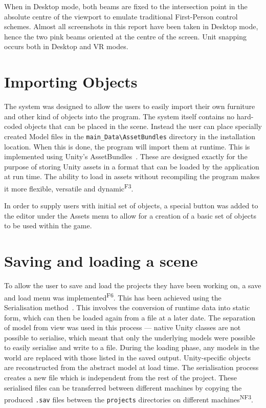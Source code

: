 When in Desktop mode, both beams are fixed to the intersection point in the absolute centre of the viewport to emulate traditional First-Person control schemes. Almost all screenshots in this report have been taken in Desktop mode, hence the two pink beams oriented at the centre of the screen. Unit snapping occurs both in Desktop and VR modes.

\section{Importing Objects}
\label{sec:objects}
\label{sec:import}
The system was designed to allow the users to easily import their own furniture and other kind of objects into the program. The system itself contains no hard-coded objects that can be placed in the scene. Instead the user can place specially created Model files in the \verb|main_Data\AssetBundles| directory in the installation location. When this is done, the program will import them  at runtime. This is implemented using Unity's AssetBundles~\cite{unity:assetbundle}. These are designed exactly for the purpose of storing Unity assets in a format that can be loaded by the application at run time. The ability to load in assets without recompiling the program makes it more flexible, versatile and dynamic\textsuperscript{F3}.

In order to supply users with initial set of objects, a special button was added to the editor under the Assets menu to allow for a creation of a basic set of objects to be used within the game.

\section{Saving and loading a scene}
\label{sec:saving}
To allow the user to save and load the projects they have been working on, a save and load menu was implemented\textsuperscript{F6}. This has been achieved using the Serialisation method~\cite{unity:serialization}. This involves the conversion of runtime data into static form, which can then be loaded again from a file at a later date. The separation of model from view was used in this process --- native Unity classes are not possible to serialise, which meant that only the underlying models were possible to easily serialise and write to a file. During the loading phase, any models in the world are replaced with those listed in the saved output. Unity-specific objects are reconstructed from the abstract model at load time. The serialisation process creates a new file which is independent from the rest of the project. These serialised files can be transferred between different machines by copying the produced \verb|.sav| files between the \verb|projects| directories on different machines\textsuperscript{NF3}.

